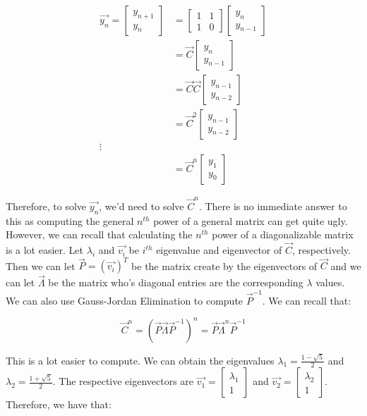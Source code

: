 \documentclass{article}
\begin{document}
\begin{align*}
\vec{y_{n}}
=
\begin{bmatrix}
y_{n+1} \\
y_{n}
\end{bmatrix}
&=
\begin{bmatrix}
1 & 1 \\
1 & 0
\end{bmatrix}
\begin{bmatrix}
y_{n} \\
y_{n-1}
\end{bmatrix} \\
&=
\vec{C}
\begin{bmatrix}
y_{n} \\
y_{n-1}
\end{bmatrix} \\
&=
\vec{C}\vec{C}
\begin{bmatrix}
y_{n-1} \\
y_{n-2}
\end{bmatrix} \\
&=
\vec{C}^{2}
\begin{bmatrix}
y_{n-1} \\
y_{n-2}
\end{bmatrix} \\
\vdots\\
&=
\vec{C}^{n}
\begin{bmatrix}
y_{1} \\
y_{0}
\end{bmatrix}
\end{align*}

Therefore, to solve $\vec{y_{n}}$, we'd need to solve $\vec{C}^{n}$. There is
no immediate answer to this as computing the general $n^{th}$ power of a
general matrix can get quite ugly. However, we can recall that calculating the
$n^{th}$ power of a diagonalizable matrix is a lot easier. Let $\lambda_{i}$
and $\vec{v_i}$ be $i^{th}$ eigenvalue and eigenvector of $\vec{C}$,
respectively. Then we can let $\vec{P}=(\vec{v_i})^{T}$ be the matrix create
by the eigenvectors of $\vec{C}$ and we can let $\vec{\Lambda}$ be the matrix
who's diagonal entries are the corresponding $\lambda$ values.
We can also use Gauss-Jordan Elimination to compute $\vec{P}^{-1}$. We can
recall that:

\begin{equation}
\vec{C}^{n}
=
\left(\vec{P}\vec{\Lambda}\vec{P}^{-1}\right)^{n}
=
\vec{P}\vec{\Lambda}^{n}\vec{P}^{-1}
\end{equation}

This is a lot easier to compute. We can obtain the eigenvalues
$\lambda_{1}=\frac{1-\sqrt{5}}{2}$ and $\lambda_{2}=\frac{1+\sqrt{5}}{2}$.
The respective eigenvectors are
$\vec{v_1}= \begin{bmatrix}\lambda_{1} \\ 1 \end{bmatrix}$ and
$\vec{v_2} = \begin{bmatrix}\lambda_{2} \\ 1 \end{bmatrix}$.
Therefore, we have that:
\end{document}

